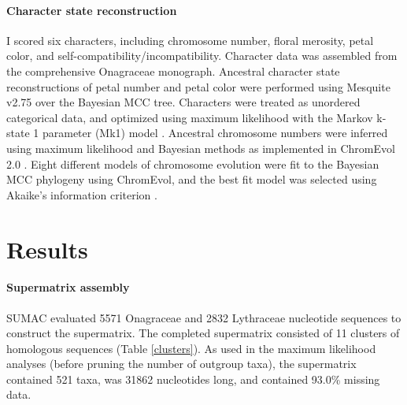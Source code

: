 \documentclass[review]{elsarticle}
\begin{document}
\paragraph{Character state reconstruction}
I scored six characters, including
chromosome number, floral merosity, petal color, and self-compatibility/incompatibility. 
Character data was assembled from the comprehensive \citet{wagner2007revised} Onagraceae monograph.
Ancestral character state reconstructions of petal number and petal color were performed using Mesquite v2.75 \citep{mesquite}
over the Bayesian MCC tree.
Characters were treated as unordered categorical data, and optimized using maximum likelihood
with the Markov k-state 1 parameter (Mk1) model \citep{lewis2001likelihood}.
Ancestral chromosome numbers were inferred using maximum likelihood and Bayesian methods 
as implemented in ChromEvol 2.0 \citep{chromevol}.
Eight different models of chromosome evolution were fit to the Bayesian MCC phylogeny using ChromEvol,
and the best fit model was selected using Akaike's information criterion \citep{aic}.


\section{Results}


\paragraph{Supermatrix assembly}
SUMAC evaluated 5571 Onagraceae and 2832 Lythraceae nucleotide sequences to construct the supermatrix. 
The completed supermatrix consisted of 11 clusters of homologous sequences (Table \ref{clusters}).
As used in the maximum likelihood analyses (before pruning the number of outgroup taxa), 
the supermatrix contained 521 taxa, was 31862 nucleotides long, and contained 93.0\% missing data.
\end{document}
